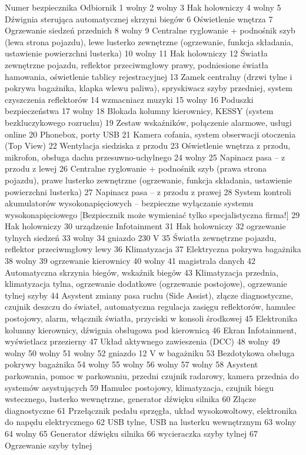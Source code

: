 Numer bezpiecznika	Odbiornik
1 wolny
2 wolny
3 Hak holowniczy
4 wolny
5 Dźwignia sterująca automatycznej skrzyni biegów
6 Oświetlenie wnętrza
7 Ogrzewanie siedzeń przednich
8 wolny
9 Centralne ryglowanie + podnośnik szyb (lewa strona pojazdu), lewe lusterko zewnętrzne (ogrzewanie, funkcja składania, ustawienie powierzchni lusterka)
10 wolny
11 Hak holowniczy
12 Światła zewnętrzne pojazdu, reflektor przeciwmgłowy prawy, podniesione światła hamowania, oświetlenie tablicy rejestracyjnej
13 Zamek centralny (drzwi tylne i pokrywa bagażnika, klapka wlewu paliwa), spryskiwacz szyby przedniej, system czyszczenia reflektorów
14 wzmacniacz muzyki
15 wolny
16 Poduszki bezpieczeństwa
17 wolny
18 Blokada kolumny kierownicy, KESSY (system bezkluczykowego rozruchu)
19 Zestaw wskaźników, połączenie alarmowe, usługi online
20 Phonebox, porty USB
21 Kamera cofania, system obserwacji otoczenia (Top View)
22 Wentylacja siedziska z przodu
23 Oświetlenie wnętrza z przodu, mikrofon, obsługa dachu przesuwno-uchylnego
24 wolny
25 Napinacz pasa – z przodu z lewej
26 Centralne ryglowanie + podnośnik szyb (prawa strona pojazdu), prawe lusterko zewnętrzne (ogrzewanie, funkcja składania, ustawienie powierzchni lusterka)
27 Napinacz pasa – z przodu z prawej
28 System kontroli akumulatorów wysokonapięciowych – bezpieczne wyłączanie systemu wysokonapięciowego [Bezpiecznik może wymieniać tylko specjalistyczna firma!]
29 Hak holowniczy
30 urządzenie Infotainment
31 Hak holowniczy
32 ogrzewanie tylnych siedzeń
33 wolny
34 gniazdo 230 V
35 Światła zewnętrzne pojazdu, reflektor przeciwmgłowy lewy
36 Klimatyzacja
37 Elektryczna pokrywa bagażnika
38 wolny
39 ogrzewanie kierownicy
40 wolny
41 magistrala danych
42 Automatyczna skrzynia biegów, wskaźnik biegów
43 Klimatyzacja przednia, klimatyzacja tylna, ogrzewanie dodatkowe (ogrzewanie postojowe), ogrzewanie tylnej szyby
44 Asystent zmiany pasa ruchu (Side Assist), złącze diagnostyczne, czujnik deszczu do świateł, automatyczna regulacja zasięgu reflektorów, hamulec postojowy, alarm, włącznik światła, przyciski w konsoli środkowej
45 Elektronika kolumny kierownicy, dźwignia obsługowa pod kierownicą
46 Ekran Infotainment, wyświetlacz przezierny
47 Układ aktywnego zawieszenia (DCC)
48 wolny
49 wolny
50 wolny
51 wolny
52 gniazdo 12 V w bagażniku
53 Bezdotykowa obsługa pokrywy bagażnika
54 wolny
55 wolny
56 wolny
57 wolny
58 Asystent parkowania, pomoc w parkowaniu, przedni czujnik radarowy, kamera przednia do systemów asystujących
59 Hamulec postojowy, klimatyzacja, czujnik biegu wstecznego, lusterko wewnętrzne, generator dźwięku silnika
60 Złącze diagnostyczne
61 Przełącznik pedału sprzęgła, układ wysokowoltowy, elektronika do napędu elektrycznego
62 USB tylne, USB na lusterku wewnętrznym
63 wolny
64 wolny
65 Generator dźwięku silnika
66 wycieraczka szyby tylnej
67 Ogrzewanie szyby tylnej

